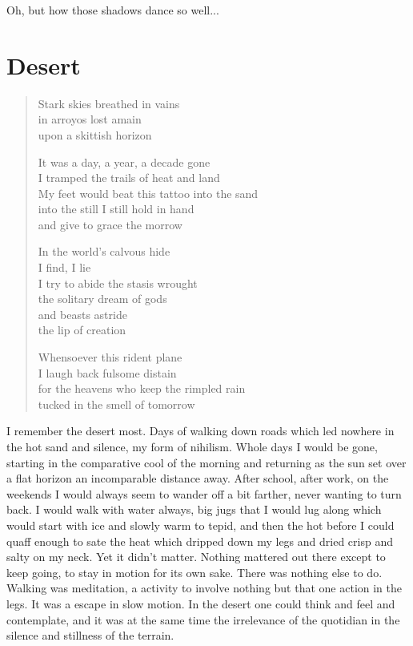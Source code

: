 \documentclass[ebook, 10pt, openright, onecolumn]{memoir}
\newenvironment{poetry}
{
  \begin{quote}
    \begin{itshape}
      \small
    }
    {
    \end{itshape}
  \end{quote}
}
\begin{document}
Oh, but how those shadows dance so well...

\chapter{Desert}
\label{cha:desert}

\begin{poetry}
  Stark skies breathed in vains\\
  in arroyos lost amain \\
  upon a skittish horizon
  
  It was a day, a year, a decade gone\\
  I tramped the trails of heat and land\\
  My feet would beat this tattoo into the sand\\
  into the still I still hold in hand\\
  and give to grace the morrow

  In the world's calvous hide\\
  I find, I lie\\
  I try to abide the stasis wrought\\
  the solitary dream of gods\\
  and beasts astride\\
  the lip of creation

  Whensoever this rident plane\\
  I laugh back fulsome distain\\
  for the heavens who keep the rimpled rain\\
  tucked in the smell of tomorrow
\end{poetry}

I remember the desert most.  Days of walking down roads which led nowhere in the
hot sand and silence, my form of nihilism.  Whole days I would be gone, starting
in the comparative cool of the morning and returning as the sun set over a flat
horizon an incomparable distance away.  After school, after work, on the
weekends I would always seem to wander off a bit farther, never wanting to turn
back.  I would walk with water always, big jugs that I would lug along which
would start with ice and slowly warm to tepid, and then the hot before I could
quaff enough to sate the heat which dripped down my legs and dried crisp and
salty on my neck.  Yet it didn't matter.  Nothing mattered out there except to
keep going, to stay in motion for its own sake.  There was nothing else to do.
Walking was meditation, a activity to involve nothing but that one action in the
legs.  It was a escape in slow motion.  In the desert one could think and feel
and contemplate, and it was at the same time the irrelevance of the quotidian in
the silence and stillness of the terrain.  
\end{document}
